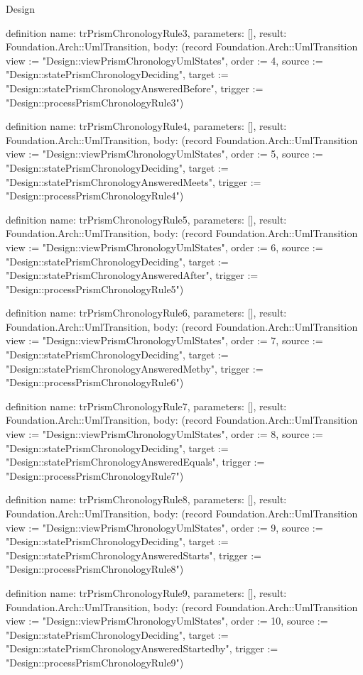\begin{lexlean}{Design}
\begin{semanticmodule}
definition{
  name: trPrismChronologyRule3,
  parameters: [],
  result: Foundation.Arch::UmlTransition,
  body: (record Foundation.Arch::UmlTransition {view := "Design::viewPrismChronologyUmlStates", order := 4, source := "Design::statePrismChronologyDeciding", target := "Design::statePrismChronologyAnsweredBefore", trigger := "Design::processPrismChronologyRule3"})
}

definition{
  name: trPrismChronologyRule4,
  parameters: [],
  result: Foundation.Arch::UmlTransition,
  body: (record Foundation.Arch::UmlTransition {view := "Design::viewPrismChronologyUmlStates", order := 5, source := "Design::statePrismChronologyDeciding", target := "Design::statePrismChronologyAnsweredMeets", trigger := "Design::processPrismChronologyRule4"})
}

definition{
  name: trPrismChronologyRule5,
  parameters: [],
  result: Foundation.Arch::UmlTransition,
  body: (record Foundation.Arch::UmlTransition {view := "Design::viewPrismChronologyUmlStates", order := 6, source := "Design::statePrismChronologyDeciding", target := "Design::statePrismChronologyAnsweredAfter", trigger := "Design::processPrismChronologyRule5"})
}

definition{
  name: trPrismChronologyRule6,
  parameters: [],
  result: Foundation.Arch::UmlTransition,
  body: (record Foundation.Arch::UmlTransition {view := "Design::viewPrismChronologyUmlStates", order := 7, source := "Design::statePrismChronologyDeciding", target := "Design::statePrismChronologyAnsweredMetby", trigger := "Design::processPrismChronologyRule6"})
}

definition{
  name: trPrismChronologyRule7,
  parameters: [],
  result: Foundation.Arch::UmlTransition,
  body: (record Foundation.Arch::UmlTransition {view := "Design::viewPrismChronologyUmlStates", order := 8, source := "Design::statePrismChronologyDeciding", target := "Design::statePrismChronologyAnsweredEquals", trigger := "Design::processPrismChronologyRule7"})
}

definition{
  name: trPrismChronologyRule8,
  parameters: [],
  result: Foundation.Arch::UmlTransition,
  body: (record Foundation.Arch::UmlTransition {view := "Design::viewPrismChronologyUmlStates", order := 9, source := "Design::statePrismChronologyDeciding", target := "Design::statePrismChronologyAnsweredStarts", trigger := "Design::processPrismChronologyRule8"})
}

definition{
  name: trPrismChronologyRule9,
  parameters: [],
  result: Foundation.Arch::UmlTransition,
  body: (record Foundation.Arch::UmlTransition {view := "Design::viewPrismChronologyUmlStates", order := 10, source := "Design::statePrismChronologyDeciding", target := "Design::statePrismChronologyAnsweredStartedby", trigger := "Design::processPrismChronologyRule9"})
}


\end{semanticmodule}
\end{lexlean}
